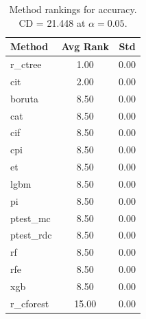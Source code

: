 \begin{table}[h]
\centering
\caption{Method rankings for accuracy. CD = 21.448 at $\alpha=0.05$.}
\label{tab:ranks_accuracy}
\begin{tabular}{lcc}
\toprule
Method & Avg Rank & Std \\
\midrule
r_ctree & 1.00 & 0.00 \\
cit & 2.00 & 0.00 \\
boruta & 8.50 & 0.00 \\
cat & 8.50 & 0.00 \\
cif & 8.50 & 0.00 \\
cpi & 8.50 & 0.00 \\
et & 8.50 & 0.00 \\
lgbm & 8.50 & 0.00 \\
pi & 8.50 & 0.00 \\
ptest_mc & 8.50 & 0.00 \\
ptest_rdc & 8.50 & 0.00 \\
rf & 8.50 & 0.00 \\
rfe & 8.50 & 0.00 \\
xgb & 8.50 & 0.00 \\
r_cforest & 15.00 & 0.00 \\
\bottomrule
\end{tabular}
\end{table}